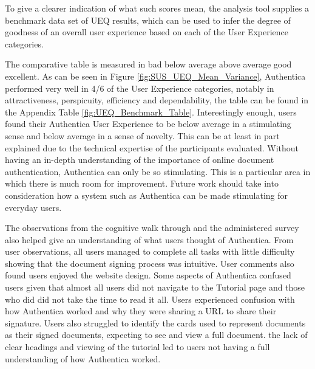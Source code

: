 \documentclass[a4,12pt]{article}
\begin{document}
To give a clearer indication of what such scores mean, the analysis tool supplies a benchmark data set of UEQ results, which can be used to infer the degree of goodness of an overall user experience based on each of the User Experience categories. %

The comparative table is measured in bad \textrightarrow below average \textrightarrow above average \textrightarrow good \textrightarrow excellent. As can be seen in Figure \ref{fig:SUS_UEQ_Mean_Variance}, Authentica performed very well in 4/6 of the User Experience categories, notably in attractiveness, perspicuity, efficiency and dependability, the table can be found in the Appendix Table \ref{fig:UEQ_Benchmark_Table}. Interestingly enough, users found their Authentica User Experience to be below average in a stimulating sense and below average in a sense of novelty. This can be at least in part explained due to the technical expertise of the participants evaluated. Without having an in-depth understanding of the importance of online document authentication, Authentica can only be so stimulating. This is a particular area in which there is much room for improvement. Future work should take into consideration how a system such as Authentica can be made stimulating for everyday users.

The observations from the cognitive walk through and the administered survey also helped give an understanding of what users thought of Authentica. From user observations, all users managed to complete all tasks with little difficulty showing that the document signing process was intuitive. User comments also found users enjoyed the website design. Some aspects of Authentica confused users given that almost all users did not navigate to the Tutorial page and those who did did not take the time to read it all. Users experienced confusion with how Authentica worked and why they were sharing a URL to share their signature. Users also struggled to identify the cards used to represent documents as their signed documents, expecting to see and view a full document. the lack of clear headings and viewing of the tutorial led to users not having a full understanding of how Authentica worked.

\end{document}
